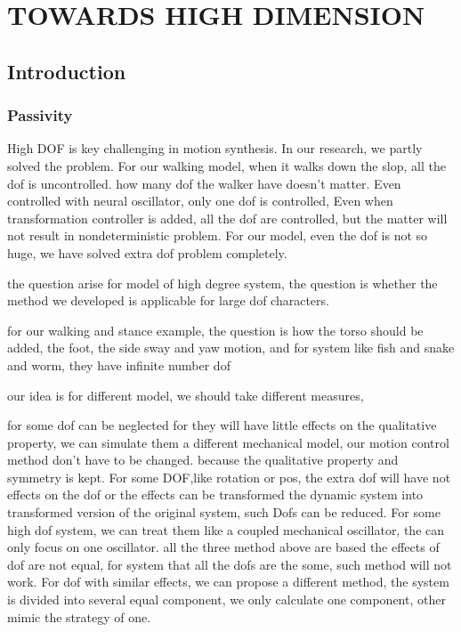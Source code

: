 \chapter{TOWARDS HIGH DIMENSION}
\label{chap:highdor}
\graphicspath{{HiDof/HiDofFigs/EPS/}{HiDof/HiDofFigs/}}
\section{Introduction}
\subsection*{Passivity}
High DOF is key challenging in motion synthesis.
In our research, we partly solved the problem.
For our walking model, when it walks down the slop, all the dof is uncontrolled.
how many dof the walker have doesn't matter.
Even controlled with neural oscillator, only one dof is controlled, 
Even when transformation controller is added, all the dof are controlled, but the matter will not result in nondeterministic problem.
For our model, even the dof is not so huge, we have solved extra dof problem completely.

the question arise for model of high degree system, the question is whether the method we developed is applicable for large dof characters.


for our walking and stance example, the question is how the torso should be added, the foot, the side sway and yaw motion, and for system like fish and snake and worm,
they have infinite number dof 

our idea is for different model, 
we should take different measures, 
\begin{itemize}

for some dof can be neglected for they will have little effects on the qualitative property, 
we can simulate them a different mechanical model, our motion control method don't have to be changed.
because the qualitative property and symmetry is kept.
For some DOF,like rotation or pos, the extra dof will have not effects on the dof or the effects can be transformed the dynamic system into transformed version of the original system, such Dofs can be reduced.
For some high dof system, we can treat them like a coupled mechanical oscillator, the can only focus on one oscillator.
all the three method above are based the effects of dof are not equal, for system that all the dofs are the some, such method will not work.
For dof with similar effects, we can propose a different method, the system is divided into several equal component, we only calculate one component, other mimic the strategy of one.
\end{itemize} 


